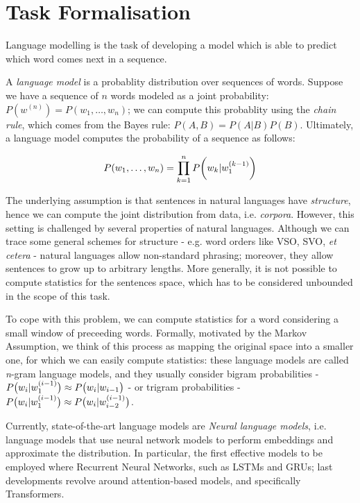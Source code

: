 \section{Task Formalisation}
Language modelling is the task of developing a model which is able to predict which word comes next in a sequence. 

A \emph{language model} is a probablity distribution over sequences of words. Suppose we have a sequence of \(n\) words modeled as a joint probability: \(P(w^{(n)}) = P(w_1, \ldots, w_n)\); we can compute this probablity using the \emph{chain rule}, which comes from the Bayes rule: \(P(A, B) = P(A|B)P(B)\). Ultimately, a language model computes the probability of a sequence as follows:

\begin{equation}
    P(w_1, \ldots, w_n)  = \prod_{k=1}^{n}P \parenth[\bigg]{w_k|w_1^{(k-1)}}
\end{equation}

The underlying assumption is that sentences in natural languages have \emph{structure}, hence we can compute the joint distribution from data, i.e. \emph{corpora}. However, this setting is challenged by several properties of natural languages. Although we can trace some general schemes for structure - e.g. word orders like VSO, SVO, \emph{et cetera} - natural languages allow non-standard phrasing; moreover, they allow sentences to grow up to arbitrary lengths. More generally, it is not possible to compute statistics for the sentences space, which has to be considered unbounded in the scope of this task.

To cope with this problem, we can compute statistics for a word considering a small window of preceeding words. Formally, motivated by the Markov Assumption, we think of this process as mapping the original space into a smaller one, for which we can easily compute statistics: these language models are called \emph{n}-gram language models, and they usually consider bigram probabilities - \(P \parenth[\big]{w_i | w_1^{(i-1)}} \approx P \parenth[\big]{w_i | w_{i-1}}\) - or trigram probabilities - \(P\parenth[\big]{w_i | w_1^{(i-1)}} \approx P \parenth[\big]{w_i | w_{i-2}^{(i-1)}}\).

Currently, state-of-the-art language models are \emph{Neural language models}, i.e. language models that use neural network models to perform embeddings and approximate the distribution. In particular, the first effective models to be employed where Recurrent Neural Networks, such as LSTMs and GRUs; last developments revolve around attention-based models, and specifically Transformers. 
